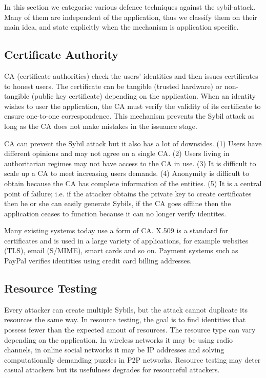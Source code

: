 In this section we categorise various defence techniques against the
sybil-attack. Many of them are independent of the application, thus we classify
them on their main idea, and state explicitly when the mechanism is application
specific.

\subsection{Certificate Authority}\label{sec:cert-authority}

CA (certificate authorities) check the users' identities and then issues
certificates to honest users. The certificate can be tangible (trusted
hardware\cite{newsome2004sybil}) or non-tangible (public key certificate)
depending on the application. When an identity wishes to user the application,
the CA must verify the validity of its certificate to ensure one-to-one
correspondence. This mechanism prevents the Sybil attack as long as the CA does
not make mistakes in the issuance stage.

CA can prevent the Sybil attack but it also has a lot of downsides. (1) Users
have different opinions and may not agree on a single CA. (2) Users living in
authoritarian regimes may not have access to the CA in use. (3) It is difficult
to scale up a CA to meet increasing users demands. (4) Anonymity is difficult to
obtain because the CA has complete information of the entities. (5) It is a
central point of failure; i.e. if the attacker obtains the private key to create
certificates then he or she can easily generate Sybils, if the CA goes offline
then the application ceases to function because it can no longer verify
identites.

Many existing systems today use a form of CA.
X.509 is a standard for certificates and is used in a large variety of
applications, for example websites (TLS), email (S/MIME), smart cards and so on.
Payment systems such as PayPal verifies identities using credit card billing addresses.

\subsection{Resource Testing}
Every attacker can create multiple Sybils, but the attack cannot duplicate its
resources the same way. In resource testing, the goal is to find identities that
possess fewer than the expected amout of resources. The resource type can vary
depending on the application. In wireless networks it may be using radio
channels\cite{newsome2004sybil}, in online social networks it may be IP
addresses\cite{freedman2002tarzan} and solving computationally demanding puzzles
in P2P networks\cite{aspnes2005exposing}. Resource testing may deter casual
attackers but its usefulness degrades for resourceful attackers.

